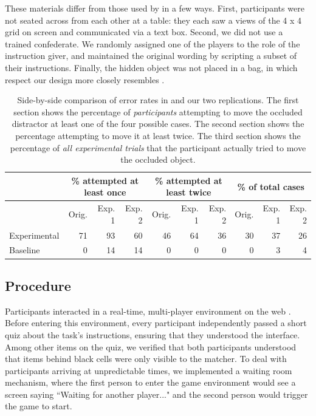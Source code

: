 \documentclass[10pt,letterpaper]{article}
\begin{document}
These materials differ from those used by  in a few ways. First, participants were not seated across from each other at a table: they each saw a views of the 4 x 4 grid on screen and communicated via a text box. Second, we did not use a trained confederate. We randomly assigned one of the players to the role of the instruction giver, and maintained the original wording by scripting a subset of their instructions. Finally, the hidden object was not placed in a bag, in which respect our design more closely resembles .

\begin{table}
\begin{center}
\begin{tabular}{ p{2cm} | r | r |  r || r | r | r || r | r | r}
& \multicolumn{3}{c||}{\% attempted at least once} & \multicolumn{3}{c||}{\% attempted at least twice} & \multicolumn{3}{c}{\% of total cases}\\
\hline
& Orig. & Exp. 1 & Exp. 2 & Orig. & Exp. 1 & Exp. 2 & Orig. & Exp. 1 & Exp. 2  \\
Experimental & 71 & 93 & 60 & 46 & 64 & 36 & 30 & 37 & 26\\
Baseline & 0 & 14 & 14 & 0 & 0 & 0 & 0 & 3 & 4\\
\end{tabular}
\caption{Side-by-side comparison of error rates in  and our two replications. The first section shows the percentage of \emph{participants} attempting to move the occluded distractor at least one of the four possible cases. The second section shows the percentage attempting to move it at least twice. The third section shows the percentage of \emph{all experimental trials} that the participant actually tried to move the occluded object. }
\label{table:mainResults}
\end{center}
\end{table}

\subsection{Procedure}

Participants interacted in a real-time, multi-player environment on the web \cite{Hawkins15_RealTimeWebExperiments}. Before entering this environment, every participant independently passed a short quiz about the task's instructions, ensuring that they understood the interface. Among other items on the quiz, we verified that both participants understood that items behind black cells were only visible to the matcher. To deal with participants arriving at unpredictable times, we implemented a waiting room mechanism, where the first person to enter the game environment would see a screen saying ``Waiting for another player..." and the second person would trigger the game to start. 
\end{document}
